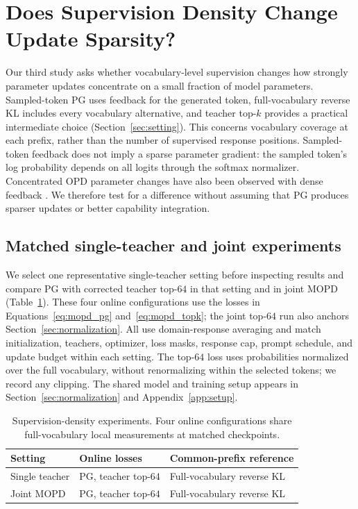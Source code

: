 \section{Does Supervision Density Change Update Sparsity?}
\label{sec:density}

Our third study asks whether vocabulary-level supervision changes how
strongly parameter updates concentrate on a small fraction of model parameters.
Sampled-token PG uses feedback for the generated token, full-vocabulary
reverse KL includes every vocabulary alternative, and teacher top-$k$
provides a practical intermediate choice
(Section~\ref{sec:setting}). This concerns vocabulary coverage at each
prefix, rather than the number of supervised response positions.
Sampled-token feedback does not imply a sparse parameter gradient:
the sampled token's log probability depends on all logits through the
softmax normalizer. Concentrated OPD parameter changes have also been
observed with dense feedback \citep{yu2026denseupdates}. We therefore
test for a difference without assuming that PG produces sparser updates
or better capability integration.

\subsection{Matched single-teacher and joint experiments}

We select one representative single-teacher setting before inspecting
results and compare PG with corrected teacher top-$64$ in that setting
and in joint MOPD (Table~\ref{tab:density_controls}). These four online
configurations use the losses in Equations~\ref{eq:mopd_pg}
and~\ref{eq:mopd_topk}; the joint top-$64$ run also anchors
Section~\ref{sec:normalization}. All use domain-response averaging and
match initialization, teachers, optimizer, loss masks, response cap,
prompt schedule, and update budget within each setting. The top-$64$
loss uses probabilities normalized over the full vocabulary, without
renormalizing within the selected tokens; we record any clipping.
The shared model and training setup appears in
Section~\ref{sec:normalization} and Appendix~\ref{app:setup}.

\begin{table}[!htbp]
\centering
\small
\begin{tabular}{lll}
\toprule
Setting & Online losses & Common-prefix reference \\
\midrule
Single teacher & PG, teacher top-$64$ & Full-vocabulary reverse KL \\
Joint MOPD & PG, teacher top-$64$ & Full-vocabulary reverse KL \\
\bottomrule
\end{tabular}
\caption{Supervision-density experiments. Four online configurations
share full-vocabulary local measurements at matched checkpoints.}
\label{tab:density_controls}
\end{table}


